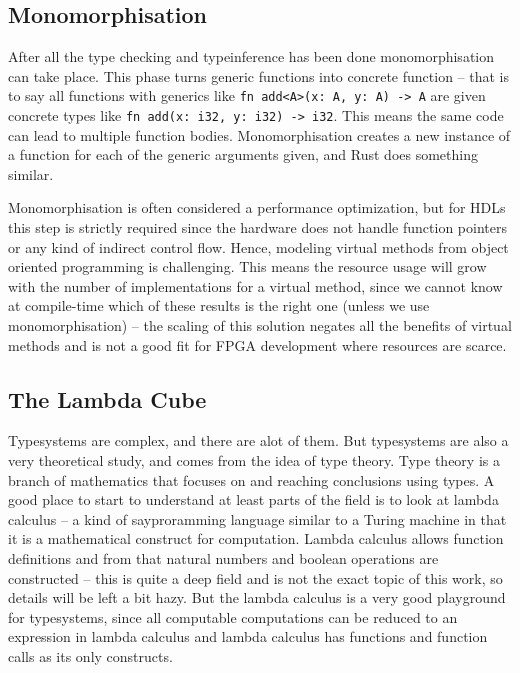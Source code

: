 \subsection{Monomorphisation}
\label{sec:Monomorphisation}
After all the type checking and typeinference has been done monomorphisation can take place. This phase turns generic functions into concrete function -- that is to say all functions with generics like \verb+fn add<A>(x: A, y: A) -> A+ are given concrete types like \verb+fn add(x: i32, y: i32) -> i32+. This means the same code can lead to multiple function bodies. Monomorphisation creates a new instance of a function for each of the generic arguments given, and Rust does something similar. \cite{src:rustMono}

Monomorphisation is often considered a performance optimization, but for HDLs this step is strictly required since the hardware does not handle function pointers or any kind of indirect control flow. Hence, modeling virtual methods from object oriented programming is challenging. This means the resource usage will grow with the number of implementations for a virtual method, since we cannot know at compile-time which of these results is the right one (unless we use monomorphisation) -- the scaling of this solution negates all the benefits of virtual methods and is not a good fit for FPGA development where resources are scarce. 

\subsection{The Lambda Cube}
\label{sec:lambdaCube}
Typesystems are complex, and there are alot of them. But typesystems are also a very theoretical study, and comes from the idea of type theory. Type theory is a branch of mathematics that focuses on and reaching conclusions using types. A good place to start to understand at least parts of the field is to look at lambda calculus -- a kind of say{proramming language} similar to a Turing machine in that it is a mathematical construct for computation. Lambda calculus allows function definitions and from that natural numbers and boolean operations are constructed -- this is quite a deep field and is not the exact topic of this work, so details will be left a bit hazy. But the lambda calculus is a very good playground for typesystems, since all computable computations can be reduced to an expression in lambda calculus and lambda calculus has functions and function calls as its only constructs.


